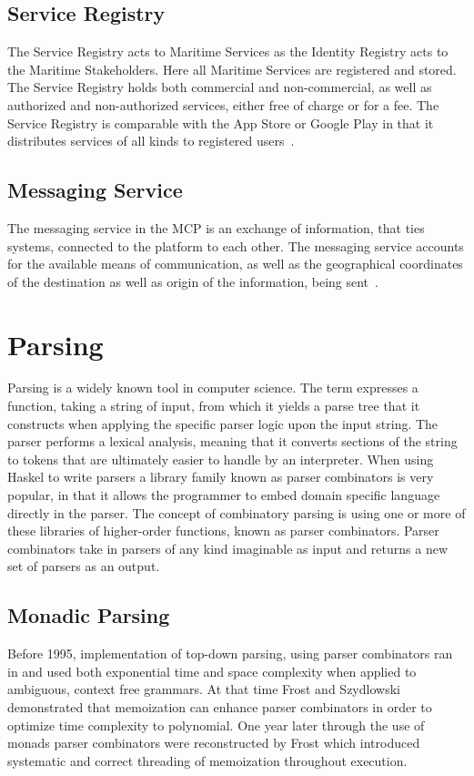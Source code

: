 \subsection{Service Registry}
The Service Registry acts to Maritime Services as the Identity Registry acts to the Maritime Stakeholders. Here all Maritime Services are registered and stored. The Service Registry holds both commercial and non-commercial, as well as authorized and non-authorized services, either free of charge or for a fee. The Service Registry is comparable with the App Store or Google Play in that it distributes services of all kinds to registered users~\cite{efficienSea2}.
\subsection{Messaging Service}
The messaging service in the MCP is an exchange of information, that ties systems, connected to the platform to each other. The messaging service accounts for the available means of communication, as well as the geographical coordinates of the destination as well as origin of the information, being sent~\cite{efficienSea2}.

\section{Parsing}
Parsing is a widely known tool in computer science. The term expresses a function, taking a string of input, from which it yields a parse tree that it constructs when applying the specific parser logic upon the input string. The parser performs a lexical analysis, meaning that it converts sections of the string to tokens that are ultimately easier to handle by an interpreter. When using Haskel to write parsers a library family known as parser combinators is very popular, in that it allows the programmer to embed domain specific language directly in the parser. The concept of combinatory parsing is using one or more of these libraries of higher-order functions, known as parser combinators. Parser combinators take in parsers of any kind imaginable as input and returns a new set of parsers as an output.
\newpage
\subsection{Monadic Parsing}
Before 1995, implementation of top-down parsing, using parser combinators ran in and used both exponential time and space complexity when applied to ambiguous, context free grammars. At that time Frost and Szydlowski demonstrated that memoization can enhance parser combinators in order to optimize time complexity to polynomial\cite{memoization}. One year later through the use of monads parser combinators were reconstructed by Frost which introduced systematic and correct threading of memoization throughout execution.

